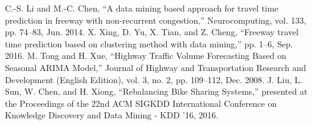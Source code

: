 \documentclass[journal, letterpaper]{IEEEtran}
\begin{document}
\begin{thebibliography}{99}
C.-S. Li and M.-C. Chen, “A data mining based approach for travel time prediction in freeway with non-recurrent congestion,” Neurocomputing, vol. 133, pp. 74–83, Jun. 2014.
X. Xing, D. Yu, X. Tian, and Z. Cheng, “Freeway travel time prediction based on clustering method with data mining,” pp. 1–6, Sep. 2016.
M. Tong and H. Xue, “Highway Traffic Volume Forecasting Based on Seasonal ARIMA Model,” Journal of Highway and Transportation Research and Development (English Edition), vol. 3, no. 2, pp. 109–112, Dec. 2008.
J. Liu, L. Sun, W. Chen, and H. Xiong, “Rebalancing Bike Sharing Systems,” presented at the Proceedings of the 22nd ACM SIGKDD International Conference on Knowledge Discovery and Data Mining - KDD '16, 2016.


\end{thebibliography}
\end{document}
